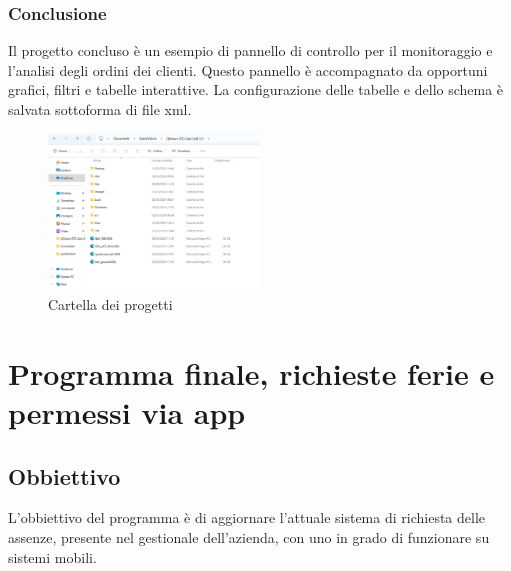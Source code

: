 \documentclass[target=bach,aauheader=,style=]{thud}
\begin{document}
\subsection{Conclusione}
Il progetto concluso è un esempio di pannello di controllo per il monitoraggio e l'analisi degli ordini dei clienti.
Questo pannello è accompagnato da opportuni grafici, filtri e tabelle interattive.
La configurazione delle tabelle e dello schema è salvata sottoforma di file xml.
\begin{figure}[H]
    \centering
    \includegraphics[width=0.5\textwidth]{quickvision/cartella progetto.png}
    \caption{Cartella dei progetti}
\end{figure}



\chapter{Programma finale, richieste ferie e permessi via app}
\section{Obbiettivo}
L'obbiettivo del programma è di aggiornare l'attuale sistema di richiesta delle assenze, presente nel gestionale dell'azienda, con uno in grado di funzionare su sistemi mobili.
\end{document}

